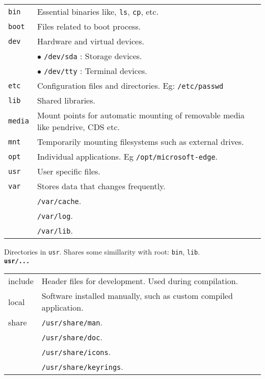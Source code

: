 \begin{tabularx}{\linewidth}{lX}
    \texttt{bin}                & Essential binaries like, \texttt{ls}, \texttt{cp}, etc.\\
    \texttt{boot}               & Files related to boot process.\\
    \texttt{dev}                & Hardware and virtual devices.\\
                                & $\bullet$ \texttt{/dev/sda} : Storage devices.\\
                                & $\bullet$ \texttt{/dev/tty} : Terminal devices.\\
    \texttt{etc}                & Configuration files and directories. Eg: \texttt{/etc/passwd}\\
    \texttt{lib}                & Shared libraries.\\
    \texttt{media}              & Mount points for automatic mounting of removable media like pendrive, CDS etc.\\
    \texttt{mnt}                & Temporarily mounting filesystems such as external drives.\\
    \texttt{opt}                & Individual applications. Eg \texttt{/opt/microsoft-edge}.\\
    \texttt{usr}                & User specific files.\\
    \texttt{var}                & Stores data that changes frequently.\\
                                & \texttt{/var/cache}.\\
                                & \texttt{/var/log}.\\ 
                                & \texttt{/var/lib}.\\ 
    \hline
\end{tabularx} 

Directories in \texttt{usr}. Shares some simillarity with root: \texttt{bin}, \texttt{lib}.\\
\vspace{8pt}
\textbf{\texttt{usr/...}}\\
\begin{tabularx}{\linewidth}{lX}
    include             & Header files for development. Used during compilation.\\
    local               & Software installed manually, such as custom compiled application.\\ 
    share               & \texttt{/usr/share/man}.\\
                        & \texttt{/usr/share/doc}.\\
                        & \texttt{/usr/share/icons}.\\
                        & \texttt{/usr/share/keyrings}.\\
    \hline
\end{tabularx}

